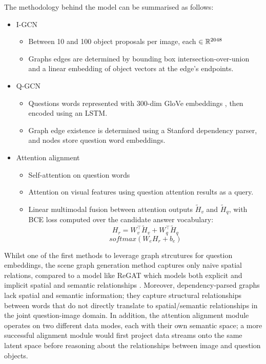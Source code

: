 The methodology behind the model can be summarised as follows:

\begin{itemize}
    \item I-GCN
    \begin{itemize}
        \item Between 10 and 100 object proposals per image, each \(\in \mathbb{R}^{2048}\)
        \item Graphs edges are determined by bounding box intersection-over-union and a linear embedding of object vectors at the edge's endpoints.
    \end{itemize}
    \item Q-GCN
    \begin{itemize}
        \item Questions words represented with 300-dim GloVe embeddings \cite{pennington2014glove}, then encoded using an LSTM.
        \item Graph edge existence is determined using a Stanford dependency parser, and nodes store question word embeddings.
    \end{itemize}
    \item Attention alignment
    \begin{itemize}
        \item Self-attention on question words
        \item Attention on visual features using question attention results as a query.
        \item Linear multimodal fusion between attention outputs \(\tilde{H}_v\) and \(\tilde{H}_q\), with BCE loss computed over the candidate answer vocabulary:
        \[H_r = W_v^\top \tilde{H}_v + W_q^\top \tilde{H}_q\]
        \[softmax(W_e H_r + b_e)\]    
    \end{itemize}
\end{itemize}
Whilst one of the first methods to leverage graph strcutures for question embeddings, the scene graph generation method captures only naive spatial relations, compared to a model like ReGAT which models both explicit and implicit spatial and semantic relationships \cite{li2019relation}. Moreover, dependency-parsed graphs lack spatial and semantic information; they capture structural relationships between words that do not directly translate to spatial/semantic relationships in the joint question-image domain. In addition, the attention alignment module operates on two different data modes, each with their own semantic space; a more successful alignment module would first project data streams onto the same latent space before reasoning about the relationships between image and question objects.

